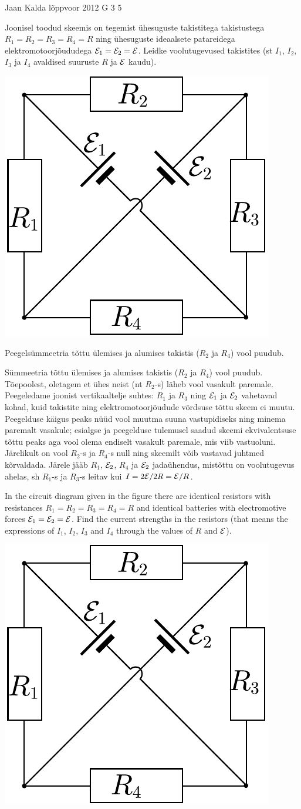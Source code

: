 {Jaan Kalda} %
{lõppvoor} %
{2012} %
{G 3} %
{5} %
{
\ifStatement
Joonisel toodud skeemis on tegemist ühesuguste takistitega takistustega $R_1 = R_2 = R_3 = R_4 = R$ ning ühesuguste
ideaalsete patareidega elektromotoorjõududega ${\cal E}_1 = {\cal E}_2
= {\cal E}$. Leidke voolutugevused takistites (st $I_1$, $I_2$, $I_3$ ja
$I_4$ avaldised suuruste $R$ ja ${\cal E}$ kaudu).

\begin{center}
\includegraphics[width=0.35\linewidth]{2012-v3g-03-elektriline_sild}%
\end{center}
\fi


\ifHint
Peegelsümmeetria tõttu ülemises ja alumises takistis ($R_2$ ja $R_4$) vool puudub. 
\fi


\ifSolution
Sümmeetria tõttu ülemises ja alumises takistis ($R_2$ ja $R_4$) vool puudub. 
Tõepoolest, oletagem et ühes neist (nt $R_2$-s) läheb vool vasakult paremale. Peegeledame joonist vertikaaltelje
suhtes: $R_1$ ja $R_3$ ning ${\cal E}_1$ ja ${\cal E}_2$ vahetavad kohad, 
kuid takistite ning elektromotoorjõudude võrdsuse tõttu skeem ei muutu. Peegelduse käigus 
peaks nüüd vool muutma suuna vastupidiseks ning minema  paremalt vasakule; esialgse ja 
peegelduse tulemusel saadud skeemi ekvivalentsuse tõttu peaks aga vool olema endiselt vasakult paremale,
mis viib vastuoluni. Järelikult on vool $R_2$-s ja $R_4$-s null ning skeemilt võib vastavad juhtmed kõrvaldada.
Järele jääb $R_1$, ${\cal E}_2$, $R_4$ ja ${\cal E}_2$ jadaühendus, mistõttu on voolutugevus ahelas, sh $R_1$-s ja $R_3$-s
leitav kui $I=2{\cal E}/2R = {\cal E}/R$.
\fi


\ifEngStatement
In the circuit diagram given in the figure there are identical resistors with resistances $R_1 = R_2 = R_3 = R_4 = R$ and identical batteries with electromotive forces ${\cal E}_1 = {\cal E}_2
= {\cal E}$. Find the current strengths in the resistors (that means the expressions of $I_1$, $I_2$, $I_3$ and $I_4$ through the values of $R$ and ${\cal E}$).
\begin{center}
\includegraphics[width=0.35\linewidth]{2012-v3g-03-elektriline_sild}%
\end{center}
\fi


}
